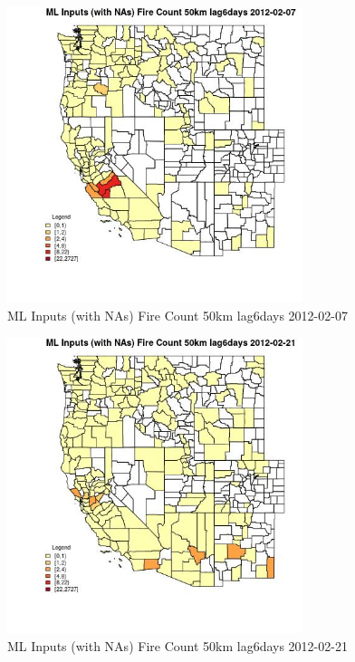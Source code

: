 \clearpage 

\begin{figure} 
\centering  
\includegraphics[width=0.77\textwidth]{Code_Outputs/Report_ML_input_PM25_Step4_part_f_de_duplicated_aveswNAs_CountyFire_Count_50km_lag6daysMean2012-02-07.jpg} 
\caption{\label{fig:Report_ML_input_PM25_Step4_part_f_de_duplicated_aveswNAsCountyFire_Count_50km_lag6daysMean2012-02-07}ML Inputs (with NAs) Fire Count 50km lag6days 2012-02-07} 
\end{figure} 
 

\begin{figure} 
\centering  
\includegraphics[width=0.77\textwidth]{Code_Outputs/Report_ML_input_PM25_Step4_part_f_de_duplicated_aveswNAs_CountyFire_Count_50km_lag6daysMean2012-02-21.jpg} 
\caption{\label{fig:Report_ML_input_PM25_Step4_part_f_de_duplicated_aveswNAsCountyFire_Count_50km_lag6daysMean2012-02-21}ML Inputs (with NAs) Fire Count 50km lag6days 2012-02-21} 
\end{figure} 
 

